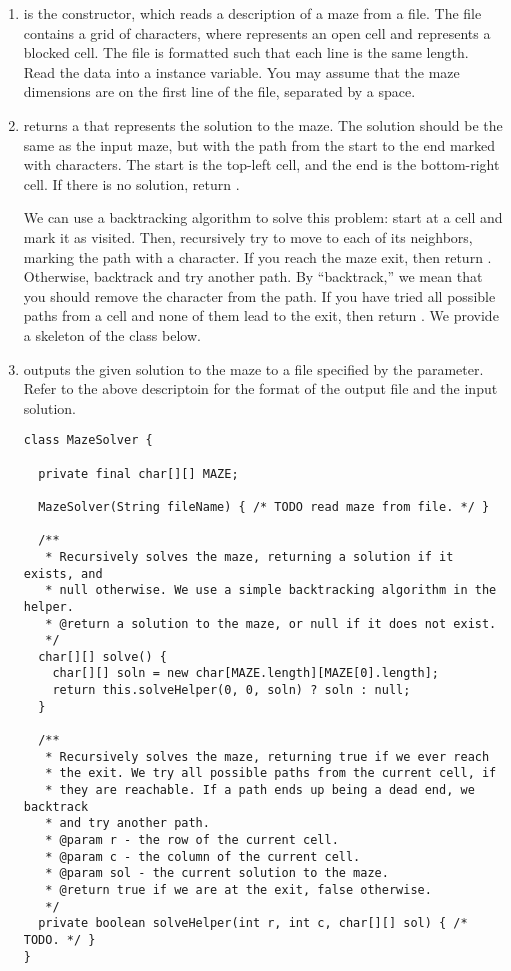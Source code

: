 \begin{enumerate}[label=(\alph*)]
    \item {} is the constructor, which reads a description of a maze from a file. The file contains a grid of characters, where  represents an open cell and  represents a blocked cell. The file is formatted such that each line is the same length. Read the data into a  instance variable. You may assume that the maze dimensions are on the first line of the file, separated by a space.

    \item {} returns a  that represents the solution to the maze. The solution should be the same as the input maze, but with the path from the start to the end marked with  characters. The start is the top-left cell, and the end is the bottom-right cell. If there is no solution, return .

    We can use a backtracking algorithm to solve this problem: start at a cell and mark it as visited. Then, recursively try to move to each of its neighbors, marking the path with a  character. If you reach the maze exit, then return . Otherwise, backtrack and try another path. By ``backtrack,'' we mean that you should remove the  character from the path. If you have tried all possible paths from a cell and none of them lead to the exit, then return . We provide a skeleton of the class below.

    \item {} outputs the given solution to the maze to a file specified by the parameter. Refer to the above descriptoin for the format of the output file and the input  solution.

\begin{lstlisting}[language=MyJava]
class MazeSolver {

  private final char[][] MAZE;

  MazeSolver(String fileName) { /* TODO read maze from file. */ }

  /**
   * Recursively solves the maze, returning a solution if it exists, and 
   * null otherwise. We use a simple backtracking algorithm in the helper.
   * @return a solution to the maze, or null if it does not exist.
   */
  char[][] solve() {
    char[][] soln = new char[MAZE.length][MAZE[0].length];
    return this.solveHelper(0, 0, soln) ? soln : null;
  }

  /**
   * Recursively solves the maze, returning true if we ever reach
   * the exit. We try all possible paths from the current cell, if
   * they are reachable. If a path ends up being a dead end, we backtrack
   * and try another path.
   * @param r - the row of the current cell.
   * @param c - the column of the current cell.
   * @param sol - the current solution to the maze.
   * @return true if we are at the exit, false otherwise.
   */
  private boolean solveHelper(int r, int c, char[][] sol) { /* TODO. */ }
}
\end{lstlisting}
\end{enumerate}

